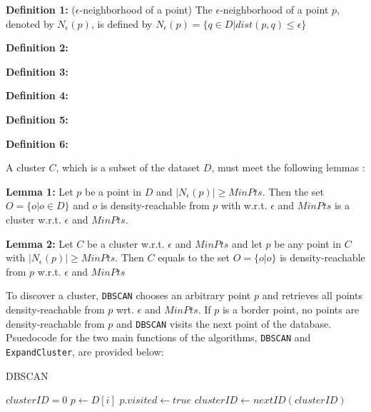 \documentclass[conference, 10pt]{IEEEtran}
\begin{document}
  \begin{description}
    \item{\textbf{Definition 1:}} ($\epsilon$-neighborhood of a point) The $\epsilon$-neighborhood of a point $p$, denoted by $N_{\epsilon}(p)$, is defined by $N_{\epsilon}(p) = \{q \in D | dist(p,q) \leq \epsilon \}$
    \item{\textbf{Definition 2:}}
    \item{\textbf{Definition 3:}}
    \item{\textbf{Definition 4:}}
    \item{\textbf{Definition 5:}}
    \item{\textbf{Definition 6:}}
  \end{description}


  A cluster $C$, which is a subset of the dataset $D$, must meet the following lemmas \cite{}:

  \begin{description}
    \item{\textbf{Lemma 1:}} Let $p$ be a point in $D$ and $|N_{\epsilon}(p)| \geq MinPts$. Then the set $O = \{o | o \in D \}$ and $o$ is density-reachable from $p$ with w.r.t. $\epsilon$ and $MinPts$ is a cluster w.r.t. $\epsilon$ and $MinPts$.
    \item{\textbf{Lemma 2:}} Let $C$ be a cluster w.r.t. $\epsilon$ and $MinPts$ and let $p$ be any point in $C$ with $|N_{\epsilon}(p)| \geq MinPts$. Then $C$ equals to the set $O = \{o | o\}$ is density-reachable from $p$ w.r.t. $\epsilon$ and $MinPts$
  \end{description}
  To discover a cluster, \texttt{DBSCAN} chooses an arbitrary point $p$ and retrieves all points density-reachable from $p$ wrt. $\epsilon$ and $MinPts$. If $p$ is a border point, no points are density-reachable from $p$ and \texttt{DBSCAN} visits the next point of the database. \cite{}\\

  Psuedocode for the two main functions of the algorithms, \texttt{DBSCAN} and \texttt{ExpandCluster}, are provided below:

  \begin{algorithm}
  \caption{DBSCAN}
  \begin{algorithmic}[1]
    \State $clusterID = 0$
        \State $p \gets D[i]$
        \State $p.visited \gets true$    
            \State $clusterID \gets nextID(clusterID)$
          \EndIf
        \EndIf
    \EndFor
  \EndProcedure
  \Statex
  \EndProcedure
  \end{algorithmic}
  \end{algorithm}
\end{document}
